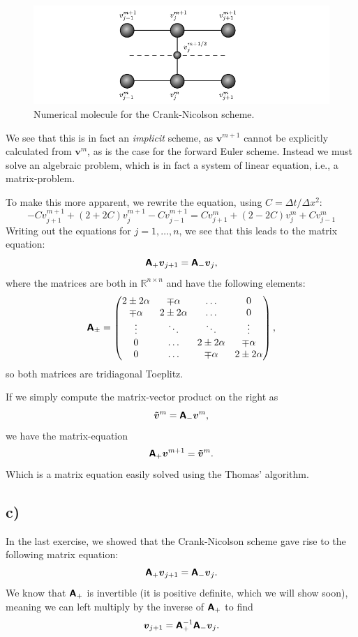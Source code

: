 \documentclass[a4paper, 11pt, notitlepage, english]{article}
\newcommand{\bt}[1]{\boldsymbol{#1}}
\newcommand{\mat}[1]{\textsf{\textbf{#1}}}
\begin{document}
\begin{figure}[h]
    \centering 
    \includegraphics[width=\textwidth]{mol3}
    \caption{Numerical molecule for the Crank-Nicolson scheme.}
\end{figure}

We see that this is in fact an \emph{implicit} scheme, as $\bt{v}^{m+1}$ cannot be explicitly calculated from $\bt{v}^m$, as is the case for the forward Euler scheme. Instead we must solve an algebraic problem, which is in fact a system of linear equation, i.e., a matrix-problem.

To make this more apparent, we rewrite the equation, using $C=\Delta t/\Delta x^2$:
$$-Cv_{j+1}^{m+1} + (2+2C)v_j^{m+1} - Cv_{j-1}^{m+1} = Cv_{j+1}^{m} + (2-2C)v_j^{m} + Cv_{j-1}^{m}$$
Writing out the equations for $j=1,\ldots,n$, we see that this leads to the matrix equation:
$$\mat{A}_+ \bt{v}_{j+1} = \mat{A}_- \bt{v}_{j},$$
where the matrices are both in $\mathbb{R}^{n\times n}$ and have the following elements:
$$ \mat{A}_\pm =
\begin{pmatrix}
2\pm2\alpha & \mp\alpha & \ldots & 0 \\
\mp\alpha & 2\pm2\alpha & \ldots & 0 \\
\vdots & \ddots & \ddots &  \vdots \\
0 & \ldots &  2\pm2\alpha & \mp\alpha \\
0 & \ldots &  \mp\alpha & 2\pm2\alpha 
\end{pmatrix},$$
so both matrices are tridiagonal Toeplitz.

If we simply compute the matrix-vector product on the right as
$$\bt{\tilde{v}}^m = \mat{A}_- \bt{v}^m,$$
we have the matrix-equation
$$\mat{A}_+ \bt{v}^{m+1} = \bt{\tilde{v}}^m.$$
Which is a matrix equation easily solved using the Thomas' algorithm.

\clearpage

\subsection*{c)}
In the last exercise, we showed that the Crank-Nicolson scheme gave rise to the following matrix equation:
$$\mat{A}_+ \bt{v}_{j+1} = \mat{A}_- \bt{v}_{j}.$$
We know that $\mat{A}_+$ is invertible (it is positive definite, which we will show soon), meaning we can left multiply by the inverse of $\mat{A}_+$ to find
$$\bt{v}_{j+1} = \mat{A}_+^{-1}\mat{A}_- \bt{v}_{j}.$$
\end{document}
